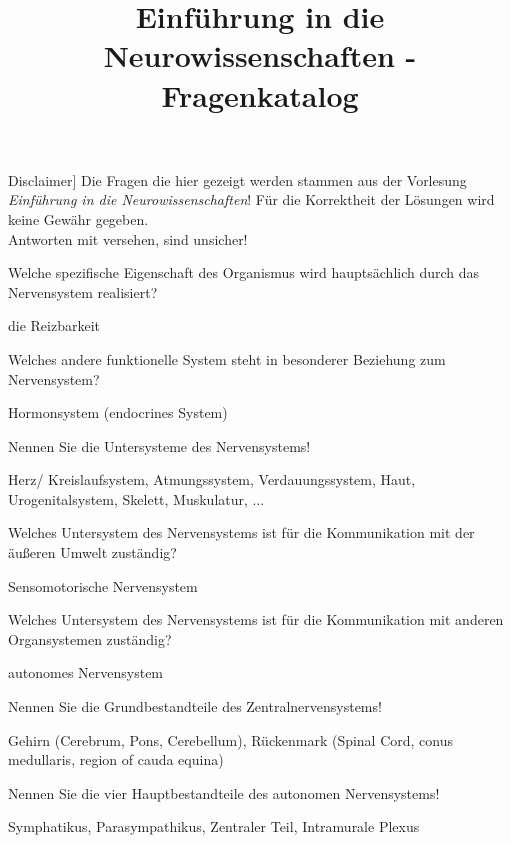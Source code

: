 \documentclass[10pt, a4paper]{exam}
\title{Einführung in die Neurowissenschaften - Fragenkatalog}
\author{}
\date{}
\newcommand\Warning{%
 \makebox[1.4em][c]{%
 \makebox[0pt][c]{\raisebox{.1em}{\small!}}%
 \makebox[0pt][c]{\color{red}\Large$\bigtriangleup$}}}%
\begin{document}
\begin{myboxii}[\Warning Disclaimer]
  Die Fragen die hier gezeigt werden stammen aus der Vorlesung \textit{Einführung in die Neurowissenschaften}! Für die Korrektheit der Lösungen wird keine Gewähr gegeben.\\
  Antworten mit \Warning versehen, sind unsicher!
\end{myboxii}

\begin{questions}
  \question Welche spezifische Eigenschaft des Organismus wird hauptsächlich durch das Nervensystem realisiert?
  \begin{solution}
    die Reizbarkeit
  \end{solution}

  \question Welches andere funktionelle System steht in besonderer Beziehung zum Nervensystem?
  \begin{solution}
    Hormonsystem (endocrines System)
  \end{solution}

  \question Nennen Sie die Untersysteme des Nervensystems!
  \begin{solution}
    Herz/ Kreislaufsystem, Atmungssystem, Verdauungssystem, Haut, Urogenitalsystem, Skelett,
    Muskulatur, ...
  \end{solution}

  \question Welches Untersystem des Nervensystems ist für die Kommunikation mit der äußeren Umwelt zuständig?
  \begin{solution}
    Sensomotorische Nervensystem
  \end{solution}

  \question Welches Untersystem des Nervensystems ist für die Kommunikation mit anderen Organsystemen zuständig?
  \begin{solution}
    autonomes Nervensystem
  \end{solution}

  \question Nennen Sie die Grundbestandteile des Zentralnervensystems!
  \begin{solution}
    Gehirn (Cerebrum, Pons, Cerebellum), Rückenmark (Spinal Cord, conus medullaris, region of
    cauda equina)
  \end{solution}

  \question Nennen Sie die vier Hauptbestandteile des autonomen Nervensystems!
  \begin{solution}
    Symphatikus, Parasympathikus, Zentraler Teil, Intramurale Plexus
  \end{solution}


\end{questions}
\end{document}

